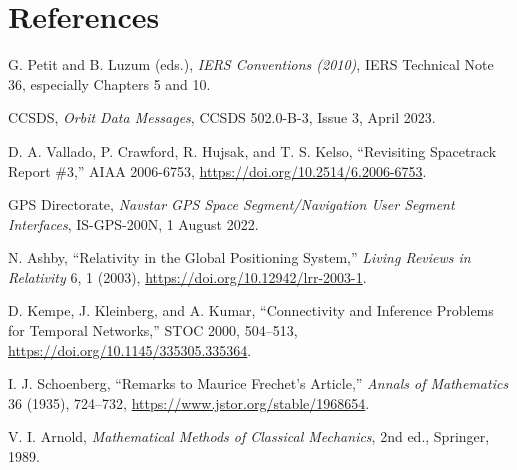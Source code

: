 \documentclass[11pt,a4paper]{article}
\theoremstyle{definition}
\theoremstyle{plain}
\theoremstyle{remark}
\begin{document}
\section*{References}

\begin{enumerate}[label={[\arabic*]},leftmargin=2em,itemsep=2pt]
  \item G. Petit and B. Luzum (eds.),
  \emph{IERS Conventions (2010)}, IERS Technical Note 36,
  especially Chapters 5 and 10.
  \item CCSDS, \emph{Orbit Data Messages},
  CCSDS 502.0-B-3, Issue 3, April 2023.
  \item D. A. Vallado, P. Crawford, R. Hujsak, and T. S. Kelso,
  ``Revisiting Spacetrack Report \#3,''
  AIAA 2006-6753, \url{https://doi.org/10.2514/6.2006-6753}.
  \item GPS Directorate,
  \emph{Navstar GPS Space Segment/Navigation User Segment
  Interfaces}, IS-GPS-200N, 1 August 2022.
  \item N. Ashby, ``Relativity in the Global Positioning System,''
  \emph{Living Reviews in Relativity} 6, 1 (2003),
  \url{https://doi.org/10.12942/lrr-2003-1}.
  \item D. Kempe, J. Kleinberg, and A. Kumar,
  ``Connectivity and Inference Problems for Temporal Networks,''
  STOC 2000, 504--513,
  \url{https://doi.org/10.1145/335305.335364}.
  \item I. J. Schoenberg,
  ``Remarks to Maurice Frechet's Article,''
  \emph{Annals of Mathematics} 36 (1935), 724--732,
  \url{https://www.jstor.org/stable/1968654}.
  \item V. I. Arnold,
  \emph{Mathematical Methods of Classical Mechanics},
  2nd ed., Springer, 1989.
\end{enumerate}
\end{document}
